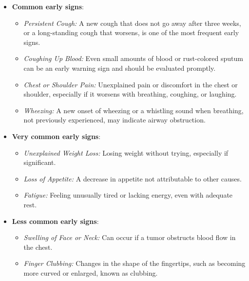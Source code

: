 \begin{itemize}
    \item \textbf{Common early signs}: 
        \begin{itemize}
            \item \textit{Persistent Cough:} A new cough that does not go away after three weeks, 
            or a long-standing cough that worsens, is one of the most frequent early signs.

            \item \textit{Coughing Up Blood:} Even small amounts of blood or rust-colored sputum 
            can be an early warning sign and should be evaluated promptly.
    
            \item \textit{Chest or Shoulder Pain:} Unexplained pain or discomfort in the chest or 
            shoulder, especially if it worsens with breathing, coughing, or laughing.
        
            \item \textit{Wheezing:} A new onset of wheezing or a whistling sound when breathing, 
            not previously experienced, may indicate airway obstruction.
        \end{itemize}
    
    \newpage
    \item \textbf{Very common early signs}:
        \begin{itemize}
            \item \textit{Unexplained Weight Loss:} Losing weight without trying, especially if 
            significant.

            \item \textit{Loss of Appetite:} A decrease in appetite not attributable to other 
            causes.
    
            \item \textit{Fatigue:} Feeling unusually tired or lacking energy, even with adequate 
            rest.
        \end{itemize}
    
    \item \textbf{Less common early signs}:
        \begin{itemize}
            \item \textit{Swelling of Face or Neck:} Can occur if a tumor obstructs blood flow in 
            the chest.

            \item \textit{Finger Clubbing:} Changes in the shape of the fingertips, such as 
            becoming more curved or enlarged, known as clubbing.
        \end{itemize}
\end{itemize}


